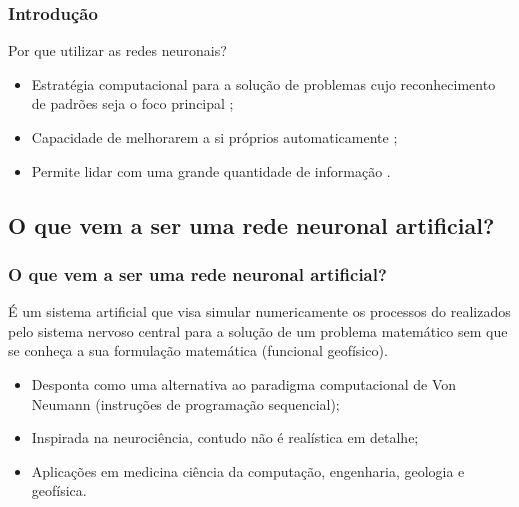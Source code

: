 \documentclass[10pt]{beamer} %
\begin{document}
\begin{frame}
	\frametitle{Introdução}
	\transboxin%
	\begin{block}{Por que utilizar as redes neuronais?}
		\begin{itemize}
			\pause
			\item Estratégia computacional para a solução de problemas cujo reconhecimento de padrões seja o foco principal \citep{MacKay2005};
			\pause
			\item Capacidade de melhorarem a si próprios automaticamente \citep{Michie1994,Levy1997};
			\pause
			\item Permite lidar com uma grande quantidade de informação \citep{Mao1996,Hall2014}.
		\end{itemize}	
	\end{block}
	
\end{frame}
\subsection{O que vem a ser uma rede neuronal artificial?}
\begin{frame}
	\frametitle{O que vem a ser uma rede neuronal artificial?}
				\pause
				\color{blue} É um sistema artificial que visa simular numericamente os processos do realizados pelo sistema nervoso central para a solução de um problema matemático sem que se conheça a sua formulação matemática (funcional geofísico). 
				\pause
				\begin{itemize}
					\item Desponta como uma alternativa ao paradigma computacional de Von Neumann (instruções de programação sequencial);
					\pause
					\item Inspirada na neurociência, contudo não é realística em detalhe;
					\pause
					\item Aplicações em medicina ciência da computação, engenharia, geologia e geofísica. 
				\end{itemize}
\end{frame}
\end{document}
